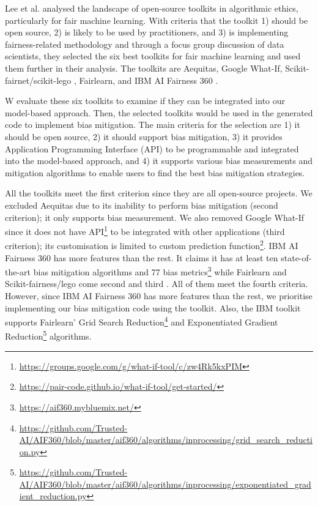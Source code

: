 \documentclass[sigconf,review]{acmart}
\begin{document}
	Lee et al. \cite{lee2021landscape} analysed the landscape of open-source toolkits in algorithmic ethics, particularly for fair machine learning. With criteria that the toolkit 1) should be open source, 2) is likely to be used by practitioners, and 3) is implementing fairness-related methodology and through a focus group discussion of data scientists, they selected the six best toolkits for fair machine learning and used them further in their analysis. The toolkits are Aequitas\cite{saleiro2019aequitas}, Google What-If\cite{googlewhatif2020}, Scikit-fairnet/scikit-lego \cite{scikitfairness2022,scikitlego2022}, Fairlearn\cite{bird2020fairlearn}, and IBM AI Fairness 360 \cite{bellamy2018ai}.  
	
	W evaluate these six toolkits to examine if they can be integrated into our model-based approach. Then, the selected toolkits would be used in the generated code to implement bias mitigation. The main criteria for the selection are 1) it should be open source, 2) it should support bias mitigation, 3) it provides Application Programming Interface (API) to be programmable and integrated into the model-based approach, and 4) it supports various bias measurements and mitigation algorithms to enable users to find the best bias mitigation strategies. 
	
	All the toolkits meet the first criterion since they are all open-source projects. We excluded Aequitas due to its inability to perform bias mitigation (second criterion); it only supports bias measurement. We also removed Google What-If since it does not have API\footnote{\url{https://groups.google.com/g/what-if-tool/c/zw4Rk5kxPIM}} to be integrated with other applications (third criterion); its customisation is limited to custom prediction function\footnote{\url{https://pair-code.github.io/what-if-tool/get-started/}}. IBM AI Fairness 360 has more features than the rest. It claims it has at least ten state-of-the-art bias mitigation algorithms and 77 bias metrics\footnote{\url{https://aif360.mybluemix.net/}} while Fairlearn and Scikit-fairness/lego come second and third \cite{lee2021landscape}. All of them meet the fourth criteria. However, since IBM AI Fairness 360 has more features than the rest, we prioritise implementing our bias mitigation code using the toolkit. Also, the IBM toolkit supports Fairlearn' Grid Search Reduction\footnote{\url{https://github.com/Trusted-AI/AIF360/blob/master/aif360/algorithms/inprocessing/grid\_search\_reduction.py}} and Exponentiated Gradient Reduction\footnote{\url{https://github.com/Trusted-AI/AIF360/blob/master/aif360/algorithms/inprocessing/exponentiated\_gradient\_reduction.py}} algorithms.
	
\end{document}
